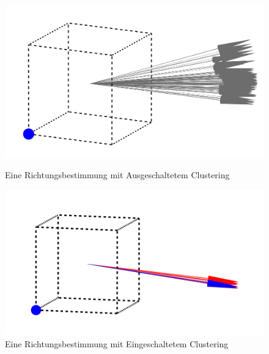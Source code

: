 \begin{figure}[H]
	\begin{minipage}[b]{0.45\textwidth}
		\centering
		\includegraphics[width=\textwidth]{img/ohne.png}
		\caption{Eine Richtungsbestimmung mit Ausgeschaltetem Clustering\label{fig:ohne}}
	\end{minipage}
	\hfill
	\begin{minipage}[b]{0.45\textwidth}
		\centering
		\includegraphics[width=\textwidth]{img/mit.png}
		\caption{Eine Richtungsbestimmung mit Eingeschaltetem Clustering\label{fig:mit}}
	\end{minipage}
\end{figure}